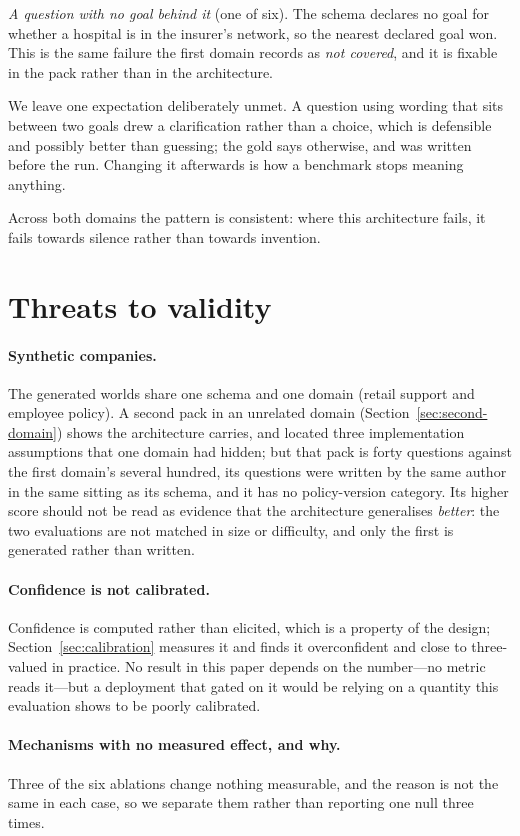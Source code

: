 \documentclass[11pt]{article}
\begin{document}
\emph{A question with no goal behind it} (one of six). The schema declares no goal for
whether a hospital is in the insurer's network, so the nearest declared goal won. This is
the same failure the first domain records as \emph{not covered}, and it is fixable in the
pack rather than in the architecture.

We leave one expectation deliberately unmet. A question using wording that sits between
two goals drew a clarification rather than a choice, which is defensible and possibly
better than guessing; the gold says otherwise, and was written before the run. Changing it
afterwards is how a benchmark stops meaning anything.

Across both domains the pattern is consistent: where this architecture fails, it fails
towards silence rather than towards invention.

\section{Threats to validity}\label{sec:threats}
\paragraph{Synthetic companies.} The generated worlds share one schema and one domain
(retail support and employee policy). A second pack in an unrelated domain
(Section~\ref{sec:second-domain}) shows the architecture carries, and located three
implementation assumptions that one domain had hidden; but that pack is forty questions
against the first domain's several hundred, its questions were written by the same author
in the same sitting as its schema, and it has no policy-version category. Its higher
score should not be read as evidence that the architecture generalises \emph{better}: the
two evaluations are not matched in size or difficulty, and only the first is generated
rather than written.
\paragraph{Confidence is not calibrated.} Confidence is computed rather than elicited, which
is a property of the design; Section~\ref{sec:calibration} measures it and finds it
overconfident and close to three-valued in practice. No result in this paper depends on
the number---no metric reads it---but a deployment that gated on it would be relying on a
quantity this evaluation shows to be poorly calibrated.
\paragraph{Mechanisms with no measured effect, and why.} Three of the six ablations change
nothing measurable, and the reason is not the same in each case, so we separate them
rather than reporting one null three times.
\end{document}
